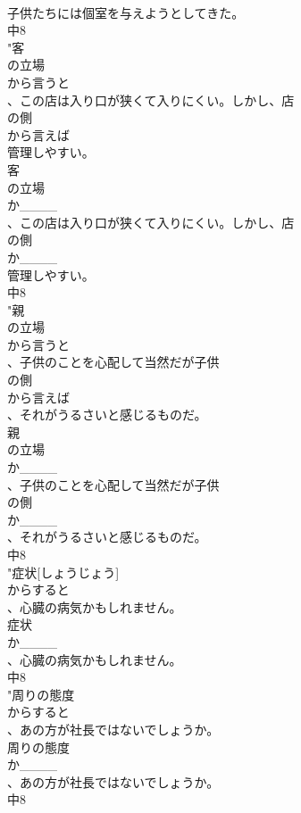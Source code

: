 \documentclass[8pt]{extreport}
\begin{document}
\begin{CJK}{UTF8}{min}
\\	子供たちには個室を与えようとしてきた。
\\	中8
\\	"客
\\	の立場
\\	から言うと
\\	、この店は入り口が狭くて入りにくい。しかし、店
\\	の側
\\	から言えば
\\	管理しやすい。
\\	客
\\	の立場
\\	か____
\\	、この店は入り口が狭くて入りにくい。しかし、店
\\	の側
\\	か____
\\	管理しやすい。
\\	中8
\\	"親
\\	の立場
\\	から言うと
\\	、子供のことを心配して当然だが子供
\\	の側
\\	から言えば
\\	、それがうるさいと感じるものだ。
\\	親
\\	の立場
\\	か____
\\	、子供のことを心配して当然だが子供
\\	の側
\\	か____
\\	、それがうるさいと感じるものだ。
\\	中8
\\	"症状[しょうじょう]
\\	からすると
\\	、心臓の病気かもしれません。
\\	症状
\\	か____
\\	、心臓の病気かもしれません。
\\	中8
\\	"周りの態度
\\	からすると
\\	、あの方が社長ではないでしょうか。
\\	周りの態度
\\	か____
\\	、あの方が社長ではないでしょうか。
\\	中8

\end{CJK}
\end{document}
